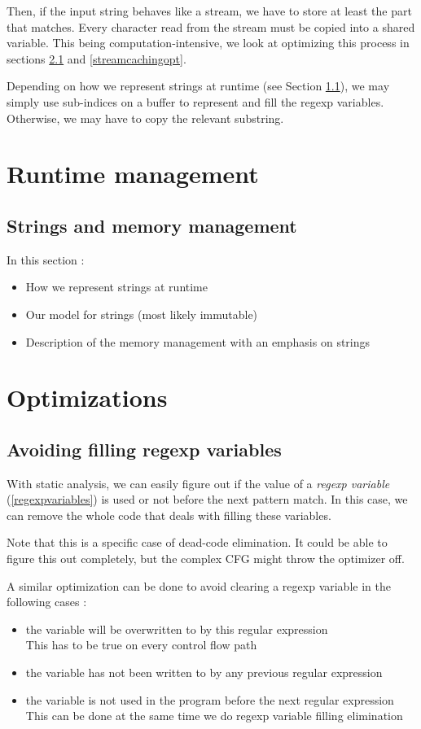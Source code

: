 \documentclass[11pt,a4paper]{report}
\begin{document}
Then, if the input string behaves like a stream, we have to store at least the part that matches. Every character read from the stream must be copied into a shared variable. This being computation-intensive, we look at optimizing this process in sections \ref{regexpvariablesoptimization} and \ref{streamcachingopt}.

Depending on how we represent strings at runtime (see Section \ref{stringrep}), we may simply use sub-indices on a buffer to represent and fill the regexp variables. Otherwise, we may have to copy the relevant substring.

\chapter{Runtime management}

\section{Strings and memory management}
\label{stringrep}

In this section :
\begin{itemize}
\item How we represent strings at runtime
\item Our model for strings (most likely immutable)
\item Description of the memory management with an emphasis on strings
\end{itemize}

\chapter{Optimizations}

\section{Avoiding filling regexp variables}
\label{regexpvariablesoptimization}

With static analysis, we can easily figure out if the value of a \textit{regexp variable} (\ref{regexpvariables}) is used or not before the next pattern match. In this case, we can remove the whole code that deals with filling these variables.

Note that this is a specific case of dead-code elimination. It could be able to figure this out completely, but the complex CFG might throw the optimizer off.

A similar optimization can be done to avoid clearing a regexp variable in the following cases :
\begin{itemize}
\item the variable will be overwritten to by this regular expression\\
This has to be true on every control flow path
\item the variable has not been written to by any previous regular expression
\item the variable is not used in the program before the next regular expression\\
This can be done at the same time we do regexp variable filling elimination
\end{itemize}
\end{document}
